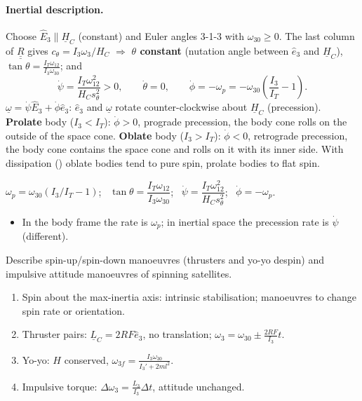 \paragraph{Inertial description.} Choose $\hat E_3\parallel\underline H_C$ (constant) and Euler angles 3-1-3 with $\omega_{30}\ge0$. The last column of $\underline{\underline R}$ gives
$c_\theta=I_3\omega_3/H_C$ $\Rightarrow$ \textbf{$\theta$ constant} (nutation angle between $\hat e_3$ and $\underline H_C$), $\tan\theta=\frac{I_T\omega_{12}}{I_3\omega_{30}}$; and
\begin{equation}
\dot\psi=\frac{I_T\omega_{12}^2}{H_Cs_\theta^2}>0,\qquad \dot\theta=0,\qquad \dot\phi=-\omega_p=-\omega_{30}\left(\frac{I_3}{I_T}-1\right).
\end{equation}
$\underline\omega=\dot\psi\hat E_3+\dot\phi\hat e_3$: $\hat e_3$ and $\underline\omega$ rotate counter-clockwise about $\underline H_C$ (precession). \textbf{Prolate} body ($I_3<I_T$): $\dot\phi>0$,
prograde precession, the body cone rolls on the outside of the space cone. \textbf{Oblate} body ($I_3>I_T$): $\dot\phi<0$, retrograde precession, the body cone
contains the space cone and rolls on it with its inner side. With dissipation () oblate bodies tend to pure spin, prolate bodies to flat spin.
\begin{keyf}
$\omega_p=\omega_{30}(I_3/I_T-1)$; \ $\tan\theta=\dfrac{I_T\omega_{12}}{I_3\omega_{30}}$; \ $\dot\psi=\dfrac{I_T\omega_{12}^2}{H_Cs_\theta^2}$; \ $\dot\phi=-\omega_p$.
\end{keyf}
\pitfalls
\begin{itemize}
\item In the body frame the rate is $\omega_p$; in inertial space the precession rate is $\dot\psi$ (different).
\end{itemize}

\begin{qbox}
Describe spin-up/spin-down manoeuvres (thrusters and yo-yo despin) and impulsive attitude manoeuvres of spinning satellites.
\end{qbox}
\begin{outline}
\begin{enumerate}
\item Spin about the max-inertia axis: intrinsic stabilisation; manoeuvres to change spin rate or orientation.
\item Thruster pairs: $\underline L_C=2RF\hat e_3$, no translation; $\omega_3=\omega_{30}\pm\frac{2RF}{I_3}t$.
\item Yo-yo: $H$ conserved, $\omega_{3f}=\frac{I_3\omega_{30}}{I_3'+2ml^2}$.
\item Impulsive torque: $\Delta\omega_3=\frac{L_3}{I_3}\Delta t$, attitude unchanged.
\end{enumerate}
\end{outline}
\answer
